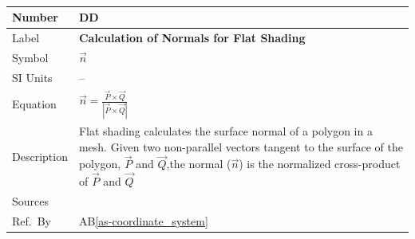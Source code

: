 \documentclass[12pt]{article}
\newcommand{\colAwidth}{0.13\textwidth}
\newcommand{\colBwidth}{0.82\textwidth}
\newcounter{defnum} %
\newcounter{datadefnum} %
\newcommand{\aBref}[1]{AB\ref{#1}}
\begin{document}
~\newline

\noindent
\begin{minipage}{\textwidth}
	\renewcommand*{\arraystretch}{1.5}
	\begin{tabular}{| p{\colAwidth} | p{\colBwidth}|}
		\hline
		\rowcolor[gray]{0.9}
		Number& DD{datadefnum}\thedatadefnum 
		\label{DD_Flat_Shading}\\
		\hline
		Label& \bf Calculation of Normals for Flat Shading\\
		\hline
		Symbol &$\vec{n}$\\
		\hline
		SI Units & --\\
		\hline
		Equation&$\vec{n} = \frac{\vec{P} \times \vec{Q}}{|\vec{P} \times 
		\vec{Q}|}$\\
		\hline
		Description & Flat shading calculates the surface normal of a polygon 
		in a mesh. Given two non-parallel vectors tangent to the surface of the 
		polygon, $\vec{P}$ and $\vec{Q}$,the normal ($\vec{n}$) is 
		the normalized cross-product of $\vec{P}$ and $\vec{Q}$ \\
		\hline
		Sources& \cite{shreiner2012}\\
		\hline
		Ref.\ By & \aBref{as-coordinate_system} \\
		\hline
	\end{tabular}
\end{minipage}\\

~\newline
\end{document}
